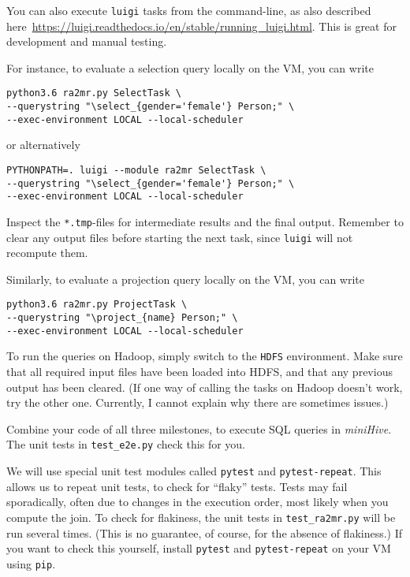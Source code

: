 \documentclass[12pt]{exam}
\begin{document}
\begin{questions}
\begin{Verbatim}[frame=single, fontsize=\small]
\end{Verbatim}


You can also execute \verb!luigi! tasks from the command-line, as also described here~\url{https://luigi.readthedocs.io/en/stable/running_luigi.html}.
This is great for development and manual testing.

For instance, to evaluate a selection query locally on the VM, you can write

\begin{Verbatim}[frame=single, fontsize=\small]
python3.6 ra2mr.py SelectTask \
--querystring "\select_{gender='female'} Person;" \
--exec-environment LOCAL --local-scheduler
\end{Verbatim}

or alternatively

\begin{Verbatim}[frame=single, fontsize=\small]
PYTHONPATH=. luigi --module ra2mr SelectTask \ 
--querystring "\select_{gender='female'} Person;" \ 
--exec-environment LOCAL --local-scheduler
\end{Verbatim}

Inspect the \verb!*.tmp!-files for intermediate results and the final output.
Remember to clear any output files before starting the next task,
since \verb!luigi! will not recompute them.

Similarly, to evaluate a projection query locally on the VM,
you can write

\begin{Verbatim}[frame=single, fontsize=\small]
python3.6 ra2mr.py ProjectTask \ 
--querystring "\project_{name} Person;" \ 
--exec-environment LOCAL --local-scheduler
\end{Verbatim}

To run the queries on Hadoop, simply switch to the \verb!HDFS! environment. Make sure that all required input files have been loaded into HDFS, and that any previous output has been cleared. (If one way of calling the tasks on Hadoop doesn't work, try the other one. Currently, I cannot explain why there are sometimes issues.)

\question
Combine your code of all three milestones, to execute SQL queries in {\em miniHive}\/. The unit tests in \verb!test_e2e.py! check this for you.

\end{questions}


\bigskip
We will use special unit test modules called \verb!pytest! and \verb!pytest-repeat!. This allows us to repeat unit tests, to check for ``flaky'' tests. Tests may fail sporadically, often due to changes in the execution order, most likely when you compute the join. To check for flakiness, the unit tests in \verb!test_ra2mr.py! will be run several times. (This is no guarantee, of course, for the absence of flakiness.)
        If you want to check this yourself, install \verb!pytest! and \verb!pytest-repeat! on your VM using \verb!pip!.
        
\end{document}
